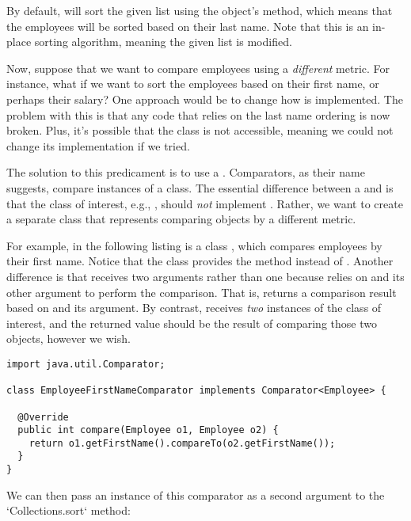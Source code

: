 By default,  will sort the given list using the object's  method, which means that the employees will be sorted based on their last name. Note that this is an in-place sorting algorithm, meaning the given list is modified.

Now, suppose that we want to compare employees using a \emph{different} metric. For instance, what if we want to sort the employees based on their first name, or perhaps their salary? One approach would be to change how  is implemented. The problem with this is that any code that relies on the last name ordering is now broken. Plus, it's possible that the  class is not accessible, meaning we could not change its implementation if we tried. 

The solution to this predicament is to use a . Comparators, as their name suggests, compare instances of a class. The essential difference between a  and  is that the class of interest, e.g., , should \emph{not} implement . Rather, we want to create a separate class that represents comparing  objects by a different metric.

For example, in the following listing is a class , which compares employees by their first name. Notice that the  class provides the  method instead of . Another difference is that  receives two arguments rather than one because  relies on  and its other argument to perform the comparison. That is,  returns a comparison result based on  and its argument. By contrast,  receives \emph{two} instances of the class of interest, and the returned value should be the result of comparing those two objects, however we wish.

\begin{lstlisting}[language=MyJava]
import java.util.Comparator;

class EmployeeFirstNameComparator implements Comparator<Employee> {

  @Override
  public int compare(Employee o1, Employee o2) {
    return o1.getFirstName().compareTo(o2.getFirstName());
  }
}
\end{lstlisting}

We can then pass an instance of this comparator as a second argument to the `Collections.sort` method:

